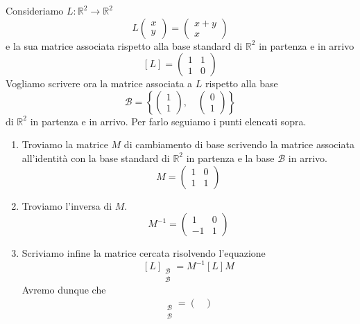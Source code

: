 \begin{example}
	Consideriamo $L : \mathbb{R}^2 \to \mathbb{R}^2$
	\[
		L \begin{pmatrix}
			x \\ y
		\end{pmatrix} =
		\begin{pmatrix}
			x + y \\ x
		\end{pmatrix}
	\]
	e la sua matrice associata rispetto alla base standard di $\mathbb{R}^2$ in
	partenza e in arrivo
	\[
		[L] = \begin{pmatrix}
			1 & 1 \\
			1 & 0
		\end{pmatrix}
	\]
	Vogliamo scrivere ora la matrice associata a $L$ rispetto alla base
	\[
		\mathcal{B} = \left\{
		\begin{pmatrix}
			1 \\ 1
		\end{pmatrix}, \quad
		\begin{pmatrix}
			0 \\ 1
		\end{pmatrix}
		\right\}
	\]
	di $\mathbb{R}^2$ in partenza e in arrivo. Per farlo seguiamo i punti elencati
	sopra.
	\begin{enumerate}
		\item Troviamo la matrice $M$ di cambiamento di base scrivendo la matrice
		      associata all'identit\`a con la base standard di $\mathbb{R}^2$ in partenza
		      e la base $\mathcal{B}$ in arrivo.
		      \[
			      M = \begin{pmatrix}
				      1 & 0 \\
				      1 & 1
			      \end{pmatrix}
		      \]
		\item Troviamo l'inversa di $M$.
		      \[
			      M^{-1} = \begin{pmatrix}
				      1  & 0 \\
				      -1 & 1
			      \end{pmatrix}
		      \]
		\item Scriviamo infine la matrice cercata risolvendo l'equazione
		      \[
			      [L]_{\substack{\mathcal{B} \\ \mathcal{B}}} =
			      M^{-1} [L] M
		      \]
		      Avremo dunque che
		      \begin{gather*}
			      [L]_{\substack{\mathcal{B} \\ \mathcal{B}}} =
			      \begin{pmatrix}

\end{pmatrix}
\end{gather*}
\end{enumerate}
\end{example}
